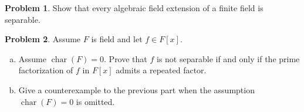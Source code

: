 \documentclass[11pt]{article}
\DeclareMathOperator{\ch}{char}
\theoremstyle{definition}
\newtheorem{problem}{Problem}
\begin{document}
\begin{problem}
Show that every algebraic field extension of a finite field is separable.	
\end{problem}


\begin{problem}
Assume $F$ is field and let $f \in F[x]$.
\begin{enumerate}[a)]
\item Assume $\ch(F) = 0$. Prove that $f$ is not separable if and only if the prime factorization of $f$ in $F[x]$ admits a repeated factor.

\item Give a counterexample to the previous part when the assumption $\ch(F) = 0$ is omitted.
\end{enumerate}
\end{problem}
\end{document}
